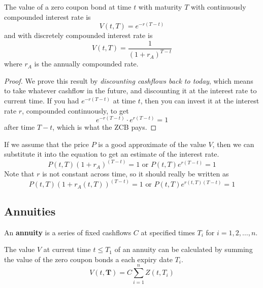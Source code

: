 \documentclass{article}
\begin{document}
    \begin{theorem}
      The value of a zero coupon bond at time $t$ with maturity $T$ with continuously compounded interest rate is 
      \begin{equation}
        V(t, T) = e^{-r(T-t)}
      \end{equation}
      and with discretely compounded interest rate is 
      \begin{equation}
        V(t, T) = \frac{1}{(1 + r_A)^{T - t}}
      \end{equation}
      where $r_A$ is the annually compounded rate. 
    \end{theorem}
    \begin{proof}
      We prove this result by \textit{discounting cashflows back to today}, which means to take whatever cashflow in the future, and discounting it at the interest rate to current time. If you had $e^{-r (T - t)}$ at time $t$, then you can invest it at the interest rate $r$, compounded continuously, to get 
      \begin{equation}
        e^{- r(T - t)} \cdot e^{r (T - t)} = 1
      \end{equation}
      after time $T - t$, which is what the ZCB pays. 
    \end{proof}

    If we assume that the price $P$ is a good approximate of the value $V$, then we can substitute it into the equation to get an estimate of the interest rate.  
    \begin{equation}
      P(t, T) (1 + r_A)^{(T - t)} = 1 \text{ or } P(t, T) e^{r (T - t)} = 1
    \end{equation}
    Note that $r$ is not constant across time, so it should really be written as 
    \begin{equation}
      P(t, T) (1 + r_A(t, T))^{(T - t)} = 1 \text{ or } P(t, T) e^{r(t, T) (T - t)} = 1
    \end{equation}

  \subsection{Annuities}

    \begin{definition}[Annuity]
      An \textbf{annuity} is a series of fixed cashflows $C$ at specified times $T_i$ for $i = 1, 2, \ldots, n$. 
    \end{definition}

    \begin{theorem}
      The value $V$ at current time $t \leq T_1$ of an annuity can be calculated by summing the value of the zero coupon bonds a each expiry date $T_i$. 
      \begin{equation}
        V(t, \mathbf{T}) = C \sum_{i=1}^n Z(t, T_i)
      \end{equation}
    \end{theorem}
\end{document}
